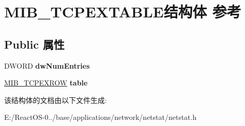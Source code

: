 \hypertarget{struct_m_i_b___t_c_p_e_x_t_a_b_l_e}{}\section{M\+I\+B\+\_\+\+T\+C\+P\+E\+X\+T\+A\+B\+L\+E结构体 参考}
\label{struct_m_i_b___t_c_p_e_x_t_a_b_l_e}
\subsection*{Public 属性}
\begin{DoxyCompactItemize}
\item 
\mbox{\label{struct_m_i_b___t_c_p_e_x_t_a_b_l_e_ac751ff3c01a7a875f118936900423beb}} 
D\+W\+O\+RD {\bfseries dw\+Num\+Entries}
\item 
\mbox{\label{struct_m_i_b___t_c_p_e_x_t_a_b_l_e_a96abef8178020f2b5f482f77ed0fd70c}} 
\hyperlink{struct_m_i_b___t_c_p_e_x_r_o_w}{M\+I\+B\+\_\+\+T\+C\+P\+E\+X\+R\+OW} {\bfseries table}
\end{DoxyCompactItemize}


该结构体的文档由以下文件生成\+:\begin{DoxyCompactItemize}
\item 
E\+:/\+React\+O\+S-\/0../base/applications/network/netstat/netstat.\+h\end{DoxyCompactItemize}
